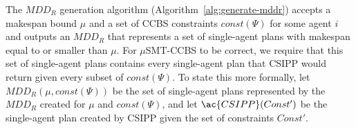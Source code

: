 \documentclass[review]{elsarticle}
\newtheorem{lemma}{Lemma}
\newcommand{\tuple}[1]{\ensuremath{\left \langle #1 \right \rangle }}
\newcommand{\mddr}{\ensuremath{MDD_R}\xspace}
\newcommand{\tov}{\ensuremath{\mathit{to}}\xspace}
\newcommand\konstantin[1]{\nb{\textbf{Konstantin:}}{red}{#1}}
\newcommand\pavel[1]{\nb{\textbf{Pavel:}}{blue}{#1}}
\newcommand{\ccbs}{\ac{CCBS}\xspace}
\newcommand{\csipp}{\ac{CSIPP}\xspace}
\newcommand{\smtccbs}{SMT-CCBS\xspace}
\newcommand{\musmtccbs}{\ensuremath{\mu}SMT-CCBS\xspace}
\newcommand{\const}{\textit{const}\xspace}
\begin{document}

The \mddr generation algorithm (Algorithm~\ref{alg:generate-mddr}) 
accepts a makespan bound $\mu$ and  
a set of \ccbs constraints $\const(\Psi)$ for some agent $i$ 
and outputs an \mddr that represents a set of single-agent plans with makespan equal to or smaller than $\mu$. 
For \musmtccbs to be correct, we require that this set of single-agent plans contains every single-agent plan that \csipp would return given every subset of $\const(\Psi)$. 
To state this more formally, let $\mddr(\mu, \const(\Psi))$ be the set of single-agent plans represented by the \mddr created for $\mu$ and $\const(\Psi)$, and let $\csipp(Const')$ be the single-agent plan created by \csipp given the set of constraints $Const'$. 

\end{document}
